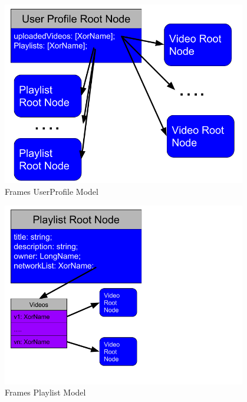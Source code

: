 \documentclass[final]{beamer}
\newlength{\onecolwid}
\newlength{\twocolwid}
\begin{document}
\begin{frame}[t]
\begin{columns}[t]
\begin{column}{\twocolwid}
\begin{columns}[t,totalwidth=\twocolwid]
\begin{column}{\onecolwid}
\end{column} %

\begin{column}{\onecolwid}\vspace{-.6in} %


\begin{block}{}

  \begin{figure}
  \includegraphics[width=0.8\linewidth]{user-profile-model.png}
  \caption{Frames UserProfile Model}
  \label{fig:user-profile-model}
  \end{figure}

  \begin{figure}
  \includegraphics[width=0.8\linewidth]{playlist-model.png}
  \caption{Frames Playlist Model}
  \label{fig:playlist-model}
  \end{figure}


\end{block}
\end{column}
\end{columns}
\end{column}
\end{columns}
\end{frame}
\end{document}
